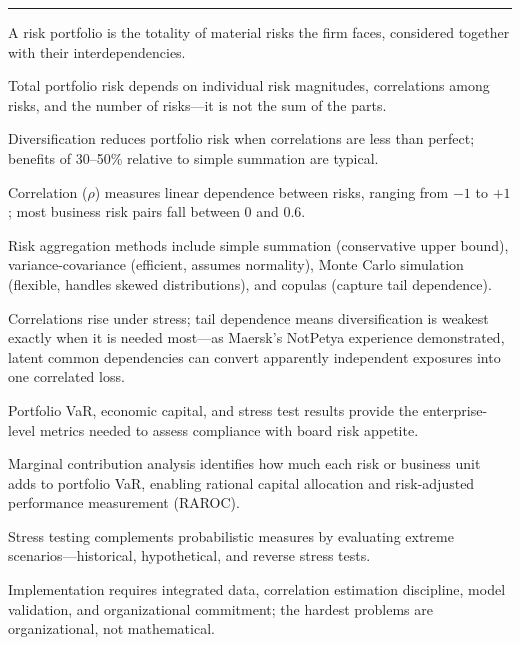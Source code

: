 \documentclass[11pt,openany]{book}
\begin{document}
\begin{center}\rule{0.5\linewidth}{0.5pt}\end{center}

\begin{keytakeaways}
\item
  A risk portfolio is the totality of material risks the firm faces,
  considered together with their interdependencies.
\item
  Total portfolio risk depends on individual risk magnitudes, correlations
  among risks, and the number of risks---it is not the sum of the parts.
\item
  Diversification reduces portfolio risk when correlations are less than
  perfect; benefits of 30--50\% relative to simple summation are typical.
\item
  Correlation (\(\rho\)) measures linear dependence between risks, ranging
  from \(-1\) to \(+1\); most business risk pairs fall between 0 and 0.6.
\item
  Risk aggregation methods include simple summation (conservative upper
  bound), variance-covariance (efficient, assumes normality), Monte Carlo
  simulation (flexible, handles skewed distributions), and copulas (capture
  tail dependence).
\item
  Correlations rise under stress; tail dependence means diversification is
  weakest exactly when it is needed most---as Maersk's NotPetya experience
  demonstrated, latent common dependencies can convert apparently independent
  exposures into one correlated loss.
\item
  Portfolio VaR, economic capital, and stress test results provide the
  enterprise-level metrics needed to assess compliance with board risk
  appetite.
\item
  Marginal contribution analysis identifies how much each risk or business
  unit adds to portfolio VaR, enabling rational capital allocation and
  risk-adjusted performance measurement (RAROC).
\item
  Stress testing complements probabilistic measures by evaluating extreme
  scenarios---historical, hypothetical, and reverse stress tests.
\item
  Implementation requires integrated data, correlation estimation discipline,
  model validation, and organizational commitment; the hardest problems are
  organizational, not mathematical.
\end{keytakeaways}
\end{document}
